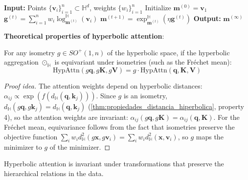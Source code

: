 \begin{algorithm}[H]
\caption{Hyperbolic Fréchet Mean}
\begin{algorithmic}[1]
    \State \textbf{Input:} Points $\{\mathbf{v}_i\}_{i=1}^n \subset \mathbb{H}^d$, weights $\{w_i\}_{i=1}^n$
    \State Initialize $\mathbf{m}^{(0)} = \mathbf{v}_1$
        \State $\mathbf{g}^{(t)} = \sum_{i=1}^n w_i \log_{\mathbf{m}^{(t)}}^{\mathbb{H}}(\mathbf{v}_i)$
        \State $\mathbf{m}^{(t+1)} = \exp_{\mathbf{m}^{(t)}}^{\mathbb{H}}(\eta \mathbf{g}^{(t)})$
    \EndFor
    \State \textbf{Output:} $\mathbf{m}^{(\infty)}$
\end{algorithmic}
\end{algorithm}

\textbf{Theoretical properties of hyperbolic attention}:

\begin{proposition}\label{prop:equivarianza_atencion_hiperbolica}
For any isometry $g \in SO^+(1,n)$ of the hyperbolic space, if the hyperbolic aggregation $\odot_{\mathbb{H}}$ is equivariant under isometries (such as the Fréchet mean):
\begin{equation}
\text{HypAttn}(g\mathbf{q}, g\mathbf{K}, g\mathbf{V}) = g \cdot \text{HypAttn}(\mathbf{q}, \mathbf{K}, \mathbf{V})
\end{equation}
\end{proposition}

\begin{proof}[Proof idea]
The attention weights depend on hyperbolic distances: $\alpha_{ij} \propto \exp(f(d_{\mathbb{H}}(\mathbf{q}, \mathbf{k}_j)))$. Since $g$ is an isometry, $d_{\mathbb{H}}(g\mathbf{q}, g\mathbf{k}_j) = d_{\mathbb{H}}(\mathbf{q}, \mathbf{k}_j)$ (\autoref{thm:propiedades_distancia_hiperbolica}, property 4), so the attention weights are invariant: $\alpha_{ij}(g\mathbf{q}, g\mathbf{K}) = \alpha_{ij}(\mathbf{q}, \mathbf{K})$. For the Fréchet mean, equivariance follows from the fact that isometries preserve the objective function $\sum_i w_i d_{\mathbb{H}}^2(g\mathbf{x}, g\mathbf{v}_i) = \sum_i w_i d_{\mathbb{H}}^2(\mathbf{x}, \mathbf{v}_i)$, so $g$ maps the minimizer to $g$ of the minimizer.
\end{proof}

\begin{corollary}\label{cor:invarianza_similaridad}
Hyperbolic attention is invariant under transformations that preserve the hierarchical relations in the data.
\end{corollary}

